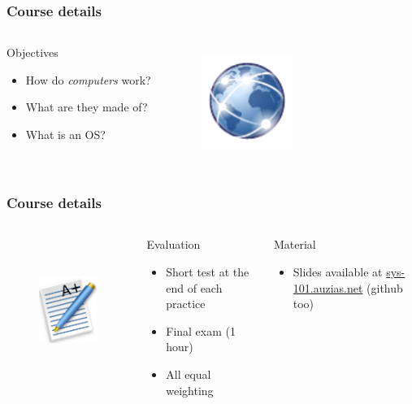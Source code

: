   \begin{frame}
    \frametitle{Course details}
    \begin{columns}
        \begin{block}{Objectives}
          \begin{itemize}
            \item How do \emph{computers} work?
            \item What are they made of?
            \item What is an OS?
          \end{itemize}
        \end{block}
        \begin{figure}[t]
          \centering
          \includegraphics[height=3cm]{./imgs/ntwks.pdf}
          \label{fig:ntwks}
        \end{figure}
    \end{columns}
  \end{frame}

  \begin{frame}
    \frametitle{Course details}
    \begin{columns}
        \begin{figure}[t]
          \centering
          \includegraphics[height=4cm]{./imgs/grade.pdf}
          \label{fig:marks}
        \end{figure}
        \begin{block}{Evaluation}
          \begin{itemize}
            \item Short test at the end of each practice
            \item Final exam (1 hour)
            \item All equal weighting
          \end{itemize}
        \end{block}
        \begin{block}{Material}
          \begin{itemize}
            \item Slides available at \color{blue}\href{http://sys-101.auzias.net}{sys-101.auzias.net} \color{black} (github too)
          \end{itemize}
        \end{block}
    \end{columns}
  \end{frame}
